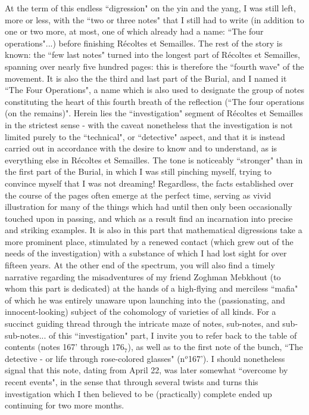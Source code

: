 At the term of this endless ``digression" on the yin and the yang, I was still left, more or less, with the ``two or three notes" that I still had to write (in addition to one or two more, at most, one of which already had a name: ``The four operations"...) before finishing R\'ecoltes et Semailles. The rest of the story is known: the ``few last notes" turned into the longest part of R\'ecoltes et Semailles, spanning over nearly five hundred pages: this is therefore the ``fourth wave" of the movement. It is also the the third and last part of the Burial, and I named it ``The Four Operations", a name which is also used to designate the group of notes constituting the heart of this fourth breath of the reflection (``The four operations (on the remains)". Herein lies the ``investigation" segment of R\'ecoltes et Semailles in the strictest sense - with the caveat nonetheless that the investigation is not limited purely to the ``technical", or ``detective" aspect, and that it is instead carried out in accordance with the desire to know and to understand, as is everything else in R\'ecoltes et Semailles. The tone is noticeably ``stronger" than in the first part of the Burial, in which I was still pinching myself, trying to convince myself that I was not dreaming! Regardless, the facts established over the course of the pages often emerge at the perfect time, serving as vivid illustration for many of the things which had until then only been occasionally touched upon in passing, and which as a result find an incarnation into precise and striking examples. It is also in this part that mathematical digressions take a more prominent place, stimulated by a renewed contact (which grew out of the needs of the investigation) with a substance of which I had lost sight for over fifteen years. At the other end of the spectrum, you will also find a timely narrative regarding the misadventures of my friend Zoghman Mebkhout (to whom this part is dedicated) at the hands of a high-flying and merciless ``mafia" of which he was entirely unaware upon launching into the (passionating, and innocent-looking) subject of the cohomology of varieties of all kinds. For a succinct guiding thread through the intricate maze of notes, sub-notes, and sub-sub-notes... of this ``investigation" part, I invite you to refer back to the table of contents (notes 167' through $176_7$), as well as to the first note of the bunch, ``The detective - or life through rose-colored glasses" (n$^o$167'). I should nonetheless signal that this note, dating from April 22, was later somewhat ``overcome by recent events", in the sense that through several twists and turns this investigation which I then believed to be (practically) complete ended up continuing for two more months.

